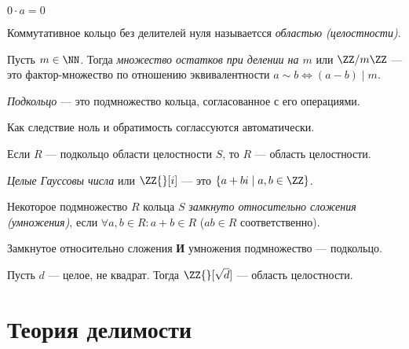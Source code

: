 \documentclass[12pt,a4paper]{article}
\begin{document}
    \begin{statement}
        $0 \cdot a = 0$
    \end{statement}

    \begin{definition}
        Коммутативное кольцо без делителей нуля называетсся \emph{областью (целостности)}.
    \end{definition}

    \begin{definition}
        Пусть $m\in\NN$. Тогда \emph{множество остатков при делении на $m$} или $\ZZ/m\ZZ$ --- это фактор-множество по отношению эквивалентности $a\sim b \Leftrightarrow (a-b) \mid m$.
    \end{definition}

    \begin{definition}
        \emph{Подкольцо} --- это подмножество кольца, согласованное с его операциями.

        Как следствие ноль и обратимость соглассуются автоматически.
    \end{definition}

    \begin{statement}
        Если $R$ --- подкольцо области целостности $S$, то $R$ --- область целостности.
    \end{statement}

    \begin{definition}
        \emph{Целые Гауссовы числа} или $\ZZ{}[i]$ --- это $\{a + bi \mid a, b \in \ZZ\}$.
    \end{definition}

    \begin{definition}
        Некоторое подмножество $R$ кольца $S$ \emph{замкнуто относительно сложения (умножения)}, если $\forall a, b \in R: a + b \in R$ ($ab \in R$ соответственно).
    \end{definition}

    \begin{remark}
        Замкнутое относительно сложения \textbf{И} умножения подмножество --- подкольцо.
    \end{remark}

    \begin{example}
        Пусть $d$ --- целое, не квадрат. Тогда $\ZZ{}[\sqrt{d}]$ --- область целостности.
    \end{example}

    \section{Теория делимости}
\end{document}
